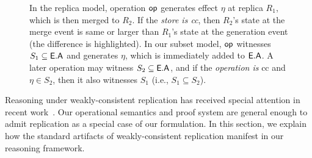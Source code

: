 \begin{figure}
{}
\hspace*{0.1in}
 \caption{\small In the replica model, operation $\textsf{op}$ generates effect
$\eta$ at replica $R_1$, which is then merged to $R_2$. If the
\emph{store is {\sc cc}}, then $R_2$'s state at the merge event is same or
larger than $R_1$'s state at the generation event (the difference is
highlighted). In our subset model, $\textsf{op}$ witnesses $S_1 \subseteq
\textsf{E}.\textsf{A}$ and generates $\eta$, which is immediately added to $\textsf{E}.\textsf{A}$. A
later operation may witness $S_2 \subseteq \textsf{E}.\textsf{A}$, and if the
\emph{operation is} {\sc cc} and $\eta \in S_2$, then it also
witnesses $S_1$ (i.e., $S_1 \subseteq S_2$). } 
\label{fig:ec-theirs-vs-ours}
\end{figure}

Reasoning under weakly-consistent replication has received special
attention in recent work~\cite{gotsmanpopl16}. Our operational
semantics and proof system are general enough to admit replication as
a special case of our formulation. In this section, we explain how the
standard artifacts of weakly-consistent replication manifest in our
reasoning framework.

